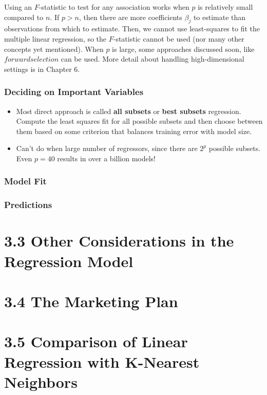            Using an $F$-statistic to test for any association works when $p$ is relatively small compared to $n$.  If $p > n$, then there are more coefficients $\beta_j$ to estimate than observations from which to estimate.  Then, we cannot use least-squares to fit the multiple linear regression, so the $F$-statistic cannot be used (nor many other concepts yet mentioned).  When $p$ is large, some approaches discussed soon, like $forward selection$ can be used.  More detail about handling high-dimensional settings is in Chapter 6.

         \subsubsection*{Deciding on Important Variables}
         \begin{itemize}
             \item Most direct approach is called \textbf{all subsets} or \textbf{best subsets} regression.  Compute the least squares fit for all possible subsets and then choose between them based on some criterion that balances training error with model size.
             \item Can't do when large number of regressors, since there are $2^p$ possible subsets.  Even $p=40$ results in over a billion models!
         \end{itemize}

         \subsubsection*{Model Fit}
         \subsubsection*{Predictions}
        
        \section*{3.3 Other Considerations in the Regression Model}\label{other-considerations-in-the-regression-model}
        
        \section*{3.4 The Marketing Plan}\label{the-marketing-plan}
        
        \section*{3.5 Comparison of Linear Regression with K-Nearest Neighbors}\label{comparison-of-linear-regression-with-k-nearest-neighbors}
        
    
